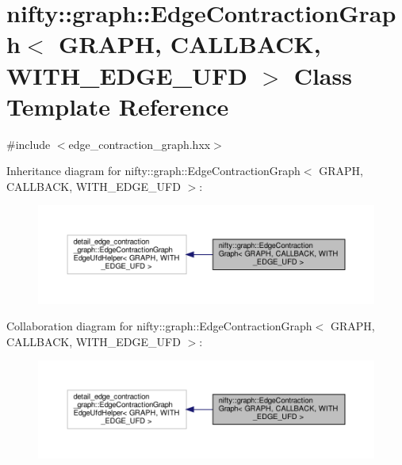 \hypertarget{classnifty_1_1graph_1_1EdgeContractionGraph}{}\section{nifty\+:\+:graph\+:\+:Edge\+Contraction\+Graph$<$ G\+R\+A\+PH, C\+A\+L\+L\+B\+A\+CK, W\+I\+T\+H\+\_\+\+E\+D\+G\+E\+\_\+\+U\+FD $>$ Class Template Reference}
\label{classnifty_1_1graph_1_1EdgeContractionGraph}


{\ttfamily \#include $<$edge\+\_\+contraction\+\_\+graph.\+hxx$>$}



Inheritance diagram for nifty\+:\+:graph\+:\+:Edge\+Contraction\+Graph$<$ G\+R\+A\+PH, C\+A\+L\+L\+B\+A\+CK, W\+I\+T\+H\+\_\+\+E\+D\+G\+E\+\_\+\+U\+FD $>$\+:
\nopagebreak
\begin{figure}[H]
\begin{center}
\leavevmode
\includegraphics[width=350pt]{classnifty_1_1graph_1_1EdgeContractionGraph__inherit__graph}
\end{center}
\end{figure}


Collaboration diagram for nifty\+:\+:graph\+:\+:Edge\+Contraction\+Graph$<$ G\+R\+A\+PH, C\+A\+L\+L\+B\+A\+CK, W\+I\+T\+H\+\_\+\+E\+D\+G\+E\+\_\+\+U\+FD $>$\+:
\nopagebreak
\begin{figure}[H]
\begin{center}
\leavevmode
\includegraphics[width=350pt]{classnifty_1_1graph_1_1EdgeContractionGraph__coll__graph}
\end{center}
\end{figure}
